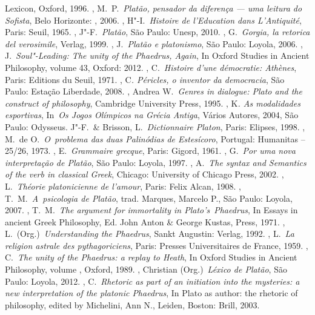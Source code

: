 \begin{bibliohedra}
{  Lexicon}, Oxford, 1996.
, M.~P.~\emph{Platão, pensador da diferença --- uma leitura do
  Sofista}, Belo Horizonte: , 2006.
, H"-I.~\emph{Histoire de l'Education dans L'Antiquité}, Paris:
  Seuil, 1965.
, J"-F.~\emph{Platão}, São Paulo: Unesp, 2010.
, G.~\emph{Gorgia, la retorica del verosimile}, Verlag, 1999.
, J.~\emph{Platão e platonismo}, São Paulo: Loyola, 2006.
, J.~\emph{Soul"-Leading: The unity of the Phaedrus, Again}, In
  Oxford Studies in Ancient Philosophy, volume 43, Oxford: 2012.
, C.~\emph{Histoire d'une démocratie: Athènes}, Paris: Editions
  du Seuil, 1971.
, C\emph{. Péricles, o inventor da democracia}, São Paulo:
  Estação Liberdade, 2008.
, Andrea W.~\emph{Genres in dialogue: Plato and the
  construct of philosophy}, Cambridge University Press, 1995.
, K\emph{. As modalidades esportivas}, In~\emph{Os Jogos
  Olímpicos na Grécia Antiga}, Vários Autores, 2004, São Paulo:
  Odysseus.
 J"-F.~\& Brisson, L.~\emph{Dictionnaire Platon}, Paris:
  Elipses, 1998.
, M.~de O.~\emph{O~problema das duas Palinódias de
  Estesícoro}, Portugal: Humanitas -- 25/\allowbreak{}26, 1973.
, E.~\emph{Grammaire grecque}, Paris: Gigord, 1961.
, G.~\emph{Por uma nova interpretação de Platão}, São Paulo:
  Loyola, 1997.
, A.~\emph{The syntax and Semantics of the verb in classical
  Greek}, Chicago: University of Chicago Press, 2002.
, L.~\emph{Théorie platonicienne de l'amour}, Paris: Felix Alcan,
  1908.
, T.~M.~\emph{A~psicologia de Platão}, trad. Marques, Marcelo
  P., São Paulo: Loyola, 2007.
, T.~M.~\emph{The argument for immortality in
  Plato's}~\emph{Phaedrus}, In Essays in ancient Greek Philosophy, Ed.
  John Anton \& George Kustas,  Press, 1971.
, L.~(Org.)~\emph{Understanding the Phaedrus}, Sankt Augustin:
  Verlag, 1992.
, L.~\emph{La religion astrale des pythagoriciens}, Paris:
  Presses Universitaires de France, 1959.
, C.~\emph{The unity of the Phaedrus: a replay to Heath}, In
  Oxford Studies in Ancient Philosophy, volume , Oxford, 1989.
, Christian (Org.)~\emph{Léxico de Platão}, São Paulo: Loyola,
  2012.
, C.~\emph{Rhetoric as part of an initiation into the
  mysteries: a new interpretation of the platonic Phaedrus}, In Plato as
  author: the rhetoric of philosophy, edited by Michelini, Ann N.,
  Leiden, Boston: Brill, 2003.

\end{bibliohedra}
